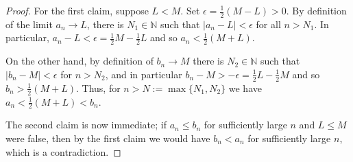 \documentclass{article}
\theoremstyle{definition} \newtheorem{definition}{Definition}
\theoremstyle{definition} \newtheorem{example}{Example}
\theoremstyle{plain} \newtheorem{axiom}{Axiom}
\theoremstyle{plain} \newtheorem*{remark}{Remark}
\theoremstyle{remark} \newtheorem*{notation}{Notation}
\theoremstyle{plain} \newtheorem{lemma}{Lemma}
\theoremstyle{plain} \newtheorem{theorem}{Theorem}
\theoremstyle{plain} \newtheorem{proposition}{Proposition}
\newcommand{\Nat}{\mathbb{N}}
\begin{document}
\begin{proof}

For the first claim, suppose $L < M$. Set $\epsilon = \frac{1}{2}(M - L) > 0$.
By definition of the limit $a_n \rightarrow L$, there is $N_1 \in \Nat$ such
that $|a_n - L| < \epsilon$ for all $n > N_1$. In particular, $a_n - L <
\epsilon = \frac{1}{2}M - \frac{1}{2}L$ and so $a_n < \frac{1}{2}(M + L)$.

On the other hand, by definition of $b_n \rightarrow M$ there is $N_2 \in \Nat$
such that $|b_n - M| < \epsilon$ for $n > N_2$, and in particular $b_n - M >
-\epsilon = \frac{1}{2}L - \frac{1}{2}M$ and so $b_n > \frac{1}{2}(M + L)$.
Thus, for $n > N:=\max\{N_1, N_2\}$ we have $a_n < \frac{1}{2}(M + L) < b_n$.

The second claim is now immediate; if $a_n \le b_n$ for sufficiently large $n$
and $L \le M$ were false, then by the first claim we would have $b_n < a_n$ for
sufficiently large $n$, which is a contradiction.

\end{proof}
\end{document}
